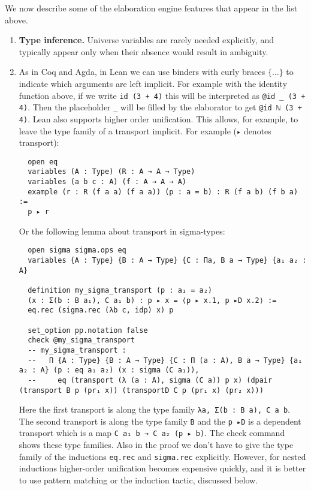 \documentclass[11pt]{amsart}  %
\begin{document}
We now describe some of the elaboration engine features that appear in the list above.
\begin{enumerate}
\item {\bf Type inference.}
  Universe variables are rarely needed explicitly, and typically appear only when their absence would result in ambiguity.
  
\item As in Coq and Agda, in Lean we can use binders with curly braces $\{ \dots \}$ to indicate which arguments are left implicit.
  For example with the identity function above, if we write \lstinline{id (3 + 4)} this will be interpreted as \lstinline{@id _ (3 + 4)}.
  Then the placeholder \lstinline{_} will be filled by the elaborator to get \lstinline{@id ℕ (3 + 4)}. Lean also supports higher order
  unification. This allows, for example, to leave the type family of a transport implicit. For example (\lstinline{▸} denotes transport):

\begin{lstlisting}
  open eq
  variables (A : Type) (R : A → A → Type)
  variables (a b c : A) (f : A → A → A)
  example (r : R (f a a) (f a a)) (p : a = b) : R (f a b) (f b a) :=
  p ▸ r
\end{lstlisting}

Or the following lemma about transport in sigma-types:

\begin{lstlisting}
  open sigma sigma.ops eq
  variables {A : Type} {B : A → Type} {C : Πa, B a → Type} {a₁ a₂ : A}

  definition my_sigma_transport (p : a₁ = a₂)
  (x : Σ(b : B a₁), C a₁ b) : p ▸ x = ⟨p ▸ x.1, p ▸D x.2⟩ :=
  eq.rec (sigma.rec (λb c, idp) x) p
 
  set_option pp.notation false
  check @my_sigma_transport
  -- my_sigma_transport :
  --   Π {A : Type} {B : A → Type} {C : Π (a : A), B a → Type} {a₁ a₂ : A} (p : eq a₁ a₂) (x : sigma (C a₁)),
  --     eq (transport (λ (a : A), sigma (C a)) p x) (dpair (transport B p (pr₁ x)) (transportD C p (pr₁ x) (pr₂ x)))
\end{lstlisting}

Here the first transport is along the type family \lstinline{λa, Σ(b : B a), C a b}. The second transport is along the type
family \lstinline{B} and the \lstinline{p ▸D} is a dependent transport which is a map \lstinline{C a₁ b → C a₂ (p ▸ b)}. The check command
shows these type families. Also in the proof we don't have to give the type family of the inductions \lstinline{eq.rec} and
\lstinline{sigma.rec} explicitly. However, for nested inductions higher-order unification becomes expensive quickly, and
it is better to use pattern matching or the induction tactic, discussed below.


\end{enumerate}
\end{document}
